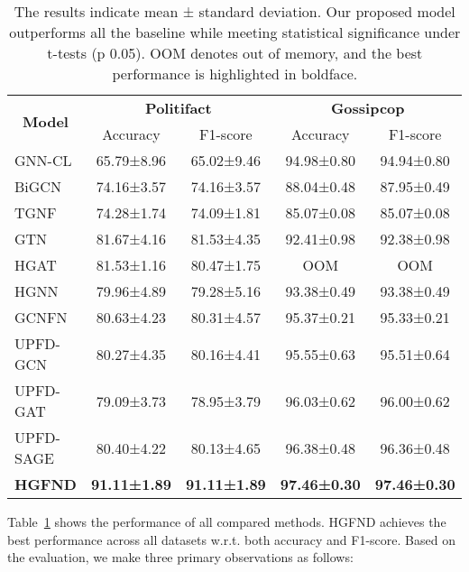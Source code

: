 \documentclass[conference]{IEEEtran}
\begin{document}
\begin{table}
\centering
\caption{The results indicate mean ± standard deviation. Our proposed model outperforms all the baseline while meeting statistical significance under t-tests (p  0.05). OOM denotes out of memory, and the best performance is highlighted in boldface.}\label{result_full_tab}

\begin{tabular}{lcccc}
\hline
\multicolumn{1}{c}{\multirow{2}{*}{\textbf{Model}}}                        & \multicolumn{2}{c}{\textbf{Politifact}}                        & \multicolumn{2}{c}{\textbf{Gossipcop}}                         \\ \cmidrule(l){2-3} \cmidrule(l){4-5} 
\multicolumn{1}{c}{}                        &
\multicolumn{1}{c}{Accuracy} & \multicolumn{1}{c}{F1-score} & \multicolumn{1}{c}{Accuracy} & \multicolumn{1}{c}{F1-score} \\
\hline
\hline

GNN-CL& 65.79±8.96 & 65.02±9.46 &94.98±0.80& 94.94±0.80\\
BiGCN & 74.16±3.57 & 74.16±3.57 & 88.04±0.48&87.95±0.49\\
TGNF & 74.28±1.74 & 74.09±1.81& 85.07±0.08& 85.07±0.08\\
GTN  & 81.67±4.16& 81.53±4.35& 92.41±0.98&92.38±0.98\\
HGAT  & 81.53±1.16&80.47±1.75 & OOM & OOM\\


HGNN & 79.96±4.89 & 79.28±5.16 & 93.38±0.49 & 93.38±0.49\\
GCNFN & 80.63±4.23& 80.31±4.57 & 95.37±0.21&95.33±0.21\\
UPFD-GCN& 80.27±4.35& 80.16±4.41& 95.55±0.63&95.51±0.64\\
UPFD-GAT & 79.09±3.73&78.95±3.79 & 96.03±0.62&96.00±0.62\\
UPFD-SAGE & 80.40±4.22 & 80.13±4.65 & 96.38±0.48 & 96.36±0.48\\


\textbf{HGFND}&\textbf{91.11±1.89} & \textbf{91.11±1.89} & \textbf{97.46±0.30} & \textbf{97.46±0.30}\\
\hline
\end{tabular}
\end{table}

Table~\ref{result_full_tab} shows the performance of all compared methods. HGFND achieves the best performance across all datasets w.r.t. both accuracy and F1-score. Based on the evaluation, we make three primary observations as follows:
\end{document}
